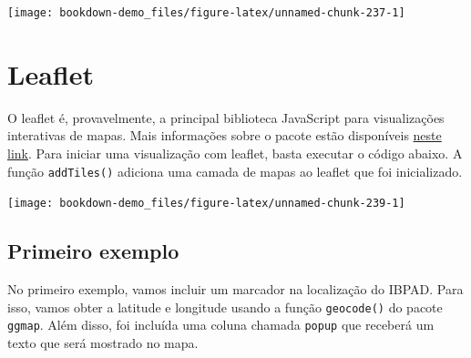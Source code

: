 \documentclass[]{book}
\newenvironment{Shaded}{\begin{snugshade}}{\end{snugshade}}
\newcommand{\KeywordTok}[1]{\textcolor[rgb]{0.13,0.29,0.53}{\textbf{#1}}}
\newcommand{\DataTypeTok}[1]{\textcolor[rgb]{0.13,0.29,0.53}{#1}}
\newcommand{\FloatTok}[1]{\textcolor[rgb]{0.00,0.00,0.81}{#1}}
\newcommand{\StringTok}[1]{\textcolor[rgb]{0.31,0.60,0.02}{#1}}
\newcommand{\CommentTok}[1]{\textcolor[rgb]{0.56,0.35,0.01}{\textit{#1}}}
\newcommand{\OperatorTok}[1]{\textcolor[rgb]{0.81,0.36,0.00}{\textbf{#1}}}
\newcommand{\NormalTok}[1]{#1}
\begin{document}
\begin{center}\texttt{[image: bookdown-demo\_files/figure-latex/unnamed-chunk-237-1]} \end{center}

\section{Leaflet}\label{leaflet}

O leaflet é, provavelmente, a principal biblioteca JavaScript para
visualizações interativas de mapas. Mais informações sobre o pacote
estão disponíveis \href{https://rstudio.github.io/leaflet/}{neste link}.
Para iniciar uma visualização com leaflet, basta executar o código
abaixo. A função \texttt{addTiles()} adiciona uma camada de mapas ao
leaflet que foi inicializado.

\begin{Shaded}
\end{Shaded}

\begin{center}\texttt{[image: bookdown-demo\_files/figure-latex/unnamed-chunk-239-1]} \end{center}

\subsection{Primeiro exemplo}\label{primeiro-exemplo}

No primeiro exemplo, vamos incluir um marcador na localização do IBPAD.
Para isso, vamos obter a latitude e longitude usando a função
\texttt{geocode()} do pacote \texttt{ggmap}. Além disso, foi incluída
uma coluna chamada \texttt{popup} que receberá um texto que será
mostrado no mapa.

\begin{Shaded}
\end{Shaded}
\end{document}
